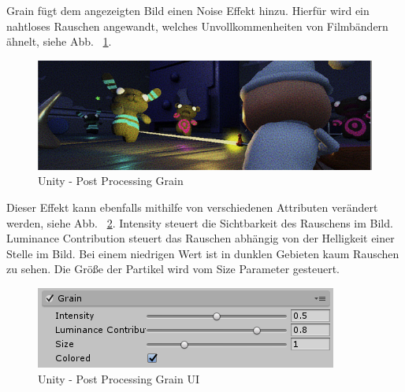 Grain fügt dem angezeigten Bild einen Noise Effekt hinzu.
Hierfür wird ein nahtloses Rauschen angewandt, welches Unvollkommenheiten von Filmbändern ähnelt, siehe Abb. ~\ref{fig:unity-post-processing-grain}.
\begin {figure}
    \centering
    \includegraphics[scale=0.9]{pics/unity-post-processing-grain-on}
    \caption{Unity - Post Processing Grain}
    \label{fig:unity-post-processing-grain}
\end {figure}
Dieser Effekt kann ebenfalls mithilfe von verschiedenen Attributen verändert werden, siehe Abb. ~\ref{fig:unity-post-processing-grain-ui}.
Intensity steuert die Sichtbarkeit des Rauschens im Bild.
Luminance Contribution steuert das Rauschen abhängig von der Helligkeit einer Stelle im Bild.
Bei einem niedrigen Wert ist in dunklen Gebieten kaum Rauschen zu sehen.
Die Größe der Partikel wird vom Size Parameter gesteuert.
\begin {figure}
    \centering
    \includegraphics[scale=0.9]{pics/unity-post-processing-grain-ui}
    \caption{Unity - Post Processing Grain UI}
    \label{fig:unity-post-processing-grain-ui}
\end {figure}
~\cite{Unity_Post_Processing_Grain_2022}

